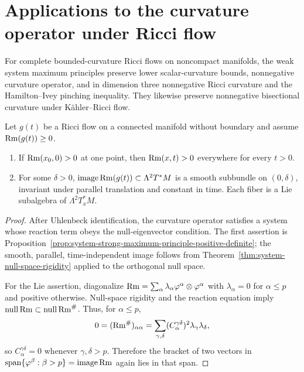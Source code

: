 \section{Applications to the curvature operator under Ricci flow}

\begin{remark}
\label{rem:noncompact-ricci-flow-curvature-consequences}
For complete bounded-curvature Ricci flows on noncompact manifolds, the weak
system maximum principles preserve lower scalar-curvature bounds,
nonnegative curvature operator, and in dimension three nonnegative Ricci
curvature and the Hamilton--Ivey pinching inequality.  They likewise preserve
nonnegative bisectional curvature under K\"ahler--Ricci flow.
\end{remark}

\begin{theorem}
\label{thm:curvature-operator-strong-maximum-principle}
Let $g(t)$ be a Ricci flow on a connected manifold without boundary and assume
$\operatorname{Rm}(g(t))\geq0$.
\begin{enumerate}
\item If $\operatorname{Rm}(x_0,0)>0$ at one point, then $\operatorname{Rm}(x,t)>0$ everywhere for every
$t>0$.
\item For some $\delta>0$, $\operatorname{image}\operatorname{Rm}(g(t))\subset
\Lambda^2T^*M$ is a smooth subbundle on $(0,\delta)$, invariant under parallel
translation and constant in time.  Each fiber is a Lie subalgebra of
$\Lambda^2T_x^*M$.
\end{enumerate}
\end{theorem}

\begin{proof}
After Uhlenbeck identification, the curvature operator satisfies a system
whose reaction term obeys the null-eigenvector condition.  The first assertion
is Proposition~\ref{prop:system-strong-maximum-principle-positive-definite};
the smooth, parallel, time-independent image follows from
Theorem~\ref{thm:system-null-space-rigidity} applied to the orthogonal null
space.

For the Lie assertion, diagonalize
$\operatorname{Rm}=\sum_\alpha\lambda_\alpha\varphi^\alpha\otimes\varphi^\alpha$ with
$\lambda_\alpha=0$ for $\alpha\leq p$ and positive otherwise.  Null-space
rigidity and the reaction equation imply
$\operatorname{null}\operatorname{Rm}\subset\operatorname{null}\operatorname{Rm}^\#$.  Thus, for
$\alpha\leq p$,
\[
0=(\operatorname{Rm}^\#)_{\alpha\alpha}
=\sum_{\gamma,\delta}(C_\alpha^{\gamma\delta})^2
\lambda_\gamma\lambda_\delta,
\]
so $C_\alpha^{\gamma\delta}=0$ whenever $\gamma,\delta>p$.  Therefore the
bracket of two vectors in
$\operatorname{span}\{\varphi^\beta:\beta>p\}=\operatorname{image}\operatorname{Rm}$
again lies in that span.
\end{proof}

